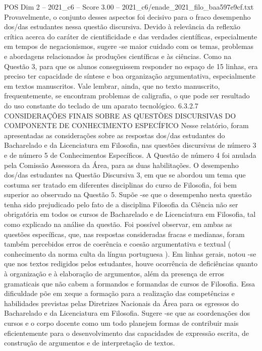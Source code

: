 \begin{textsample}{POS Dim 2 – 2021\_c6 – Score 3.00 – 2021\_c6/enade\_2021\_filo\_baa597e9cf.txt}
Provavelmente, o conjunto desses aspectos foi decisivo para o fraco desempenho dos/das estudantes nessa questão discursiva.
Devido à relevância da reflexão crítica acerca do caráter de cientificidade e das verdades científicas, especialmente em tempos de negacionismos, sugere -se maior cuidado com os temas, problemas e abordagens relacionados às produções científicas e às ciências.
Como na Questão 3, para que os alunos conseguissem responder no espaço de 15 linhas, era preciso ter capacidade de síntese e boa organização argumentativa, especialmente em textos manuscritos.
Vale lembrar, ainda, que no texto manuscrito, frequentemente, se encontram problemas de caligrafia, o que pode ser resultado do uso constante do teclado de um aparato tecnológico. 6.3.2.7 CONSIDERAÇÕES FINAIS SOBRE AS QUESTÕES DISCURSIVAS DO COMPONENTE DE CONHECIMENTO ESPECÍFICO Nesse relatório, foram apresentadas as considerações sobre as respostas dos/das estudantes do Bacharelado e da Licenciatura em Filosofia, nas questões discursivas de número 3 e de número 5 de Conhecimentos Específicos.
A Questão de número 4 foi anulada pela Comissão Assessora da Área, para as duas habilitações.
O desempenho dos/das estudantes na Questão Discursiva 3, em que se abordou um tema que costuma ser tratado em diferentes disciplinas do curso de Filosofia, foi bem superior ao observado na Questão 5.
Supõe -se que o desempenho nesta questão tenha sido prejudicado pelo fato de a disciplina Filosofia da Ciência não ser obrigatória em todos os cursos de Bacharelado e de Licenciatura em Filosofia, tal como explicado na análise da questão.
Foi possível observar, em ambas as questões específicas, que, nas respostas consideradas fracas e medianas, foram também percebidos erros de coerência e coesão argumentativa e textual ( conhecimento da norma culta da língua portuguesa ).
Em linhas gerais, notou -se que nos textos redigidos pelos estudantes, houve ocorrência de deficiências quanto à organização e à elaboração de argumentos, além da presença de erros gramaticais que não cabem a formandos e formandas de cursos de Filosofia.
Essa dificuldade põe em xeque a formação para a realização das competências e habilidades previstas pelas Diretrizes Nacionais da Área para os egressos do Bacharelado e da Licenciatura em Filosofia.
Sugere -se que as coordenações dos cursos e o corpo docente como um todo planejem formas de contribuir mais eficientemente para o desenvolvimento das capacidades de expressão escrita, de construção de argumentos e de interpretação de textos.

\end{textsample}
